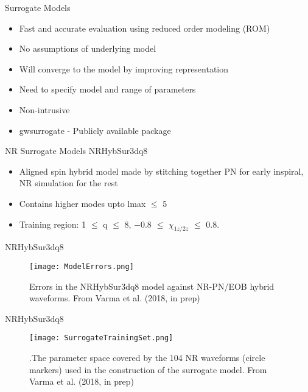 \documentclass[uncompress,aspectratio=43]{beamer}  %
\begin{document}
\begin{frame}{Surrogate Models}
  \begin{itemize}
    \item Fast and accurate evaluation using reduced order modeling (ROM)
  \item No assumptions of underlying model
    \item Will converge to the model by improving representation
    \item Need to specify model and range of parameters
    \item Non-intrusive
      \item gwsurrogate - Publicly available package
        
\end{itemize}

\end{frame}

  \begin{frame}{NR Surrogate Models}
    NRHybSur3dq8
    \begin{itemize}
\item Aligned spin hybrid model made by stitching together PN for early inspiral, NR simulation
  for the rest
\item Contains higher modes upto lmax $\le$ 5
\item Training region: 1 $\le$ q $\le$ 8, −0.8 $\le$ $\chi_{1z/2z}$ $\le$ 0.8. 
\end{itemize}
\end{frame}

\begin{frame}{NRHybSur3dq8}
  \begin{figure}
    \begin{center}
      \texttt{[image: ModelErrors.png]}
      \caption{Errors in the NRHybSur3dq8 model against NR-PN/EOB hybrid
        waveforms.
        From Varma et al. (2018, in prep)}
    \end{center}
  \end{figure}
\end{frame}

\begin{frame}{NRHybSur3dq8}
    \begin{figure}
    \begin{center}
      \texttt{[image: SurrogateTrainingSet.png]}
      \caption{.The parameter space covered by the 104 NR waveforms (circle markers) used in the construction of the surrogate model. From Varma et al. (2018, in prep)}
    \end{center}
  \end{figure}
\end{frame}
\end{document}
